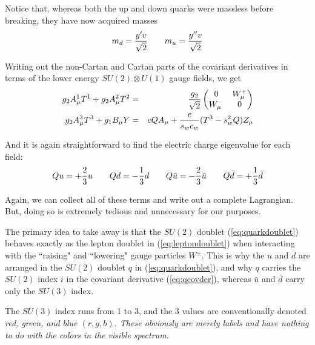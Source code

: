 \documentclass[12pt,epsf]{article}
\def\nolabel{\nonumber }
\def\nolabel{\nonumber }
\begin{document}
Notice that, whereas both the up and down quarks were massless before
breaking, they have now acquired masses
\begin{eqnarray}
m_d = {y' v \over \sqrt{2}} \qquad m_u = {y'' v \over \sqrt{2}}\nolabel
\end{eqnarray}

Writing out the non-Cartan and Cartan parts of the covariant
derivatives in terms of the lower energy $SU(2)\otimes U(1)$ gauge
fields, we get
\begin{eqnarray}
g_2 A^1_{\mu}T^1 + g_2A^2_{\mu}T^2 &=& {g_2 \over \sqrt{2}}
\begin{pmatrix}
0 & W^+_{\mu} \\ W^-_{\mu} & 0 
\end{pmatrix}\nolabel \\
g_2A^3_{\mu}T^3 + g_1B_{\mu}Y &=& eQA_{\mu}+{e \over s_wc_w} (T^3 -
s^2_wQ)Z_{\mu}\nolabel
\end{eqnarray}

And it is again straightforward to find the electric charge eigenvalue
for each field:
\begin{eqnarray}
Qu = + {2\over 3}u \qquad Qd = -{1\over 3}d \qquad Q\bar u = -{2\over
3} \bar u \qquad Q\bar d = +{1\over 3} \bar d\nolabel
\end{eqnarray}

Again, we can collect all of these terms and write out a complete
Lagrangian.  But, doing so is extremely tedious and unnecessary for our
purposes.  

The primary idea to take away is that the $SU(2)$ doublet
(\ref{eq:quarkdoublet}) behaves exactly as the lepton doublet in
(\ref{eq:leptondoublet}) when interacting with the ``raising" and
``lowering" gauge particles $W^{\pm}$.	This is why the $u$ and $d$ are
arranged in the $SU(2)$ doublet $q$ in (\ref{eq:quarkdoublet}), and why
$q$ carries the $SU(2)$ index $i$ in the covariant derivative
(\ref{eq:qcovder}), whereas $\bar u$ and $\bar d$ carry only the
$SU(3)$ index.	

The $SU(3)$ index runs from 1 to 3, and the 3 values are
conventionally denoted \it red, green\rm, and \it blue \rm $(r,g,b)$. 
These obviously are merely labels and have nothing to do with the
colors in the visible spectrum.  
\end{document}
